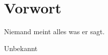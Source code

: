 %
%
\chapter*{Vorwort}
\thispagestyle{empty}

\epigraph{Niemand meint alles was er sagt.}{Unbekannt}

\lipsum[2-3]
